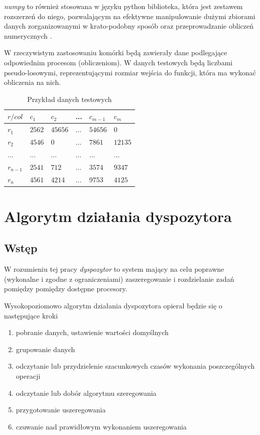 \documentclass[brudnopis]{xmgr}
\begin{document}
\emph{numpy} to również stosowana w języku python biblioteka, która jest zestawem rozszerzeń do niego, pozwalającym na efektywne manipulowanie dużymi zbiorami danych zorganizowanymi w krato-podobny sposób oraz przeprowadzanie obliczeń numerycznych \cite{NUMPY1:2020:X} \cite{NUMPY2:1999:X}.
\medskip

W rzeczywistym zastosowaniu komórki będą zawierały dane podlegające odpowiednim procesom (obliczeniom).
W danych testowych będą liczbami pseudo-losowymi, reprezentującymi rozmiar wejścia do funkcji, która ma wykonać obliczenia na nich.
\medskip

\begin{table}[!tbh]
\begin{tabular}{|l|l|l|l|l|l|} \hline
$r / col$   & $c_1$     & $c_2$     & ...   & $c_{m-1}$ & $c_{m}$   \\ \hline
$r_1$       & $2562$    & $45656$   & ...   & $54656$   & $0$       \\ \hline
$r_2$       & $4546$    & $0$       & ...   & $7861$    & $12135$   \\ \hline
$...$       & $...$     & $...$     & $...$ & $...$     & $...$     \\ \hline
$r_{n-1}$   & $2541$   & $712$      & ...   & $3574$    & $9347$    \\ \hline
$r_{n}$     & $4561$   & $4214$     & ...   & $9753$    & $4125$    \\ \hline
\end{tabular}
\caption{Przykład danych testowych\label{tab:example-test_data}}
\end{table}

\chapter{Algorytm działania dyspozytora}

\section{Wstęp}

W rozumieniu tej pracy \emph{dyspozytor} to system mający na celu poprawne (wykonalne i zgodne z ograniczeniami) zaszeregowanie i rozdzielanie zadań pomiędzy pomiędzy dostępne procesory.
\medskip

Wysokopoziomowo algorytm działania dyspozytora opierał będzie się o następujące kroki

\begin{enumerate}
    \item pobranie danych, ustawienie wartości domyślnych
    \item grupowanie danych
    \item odczytanie lub przydzielenie szacunkowych czasów wykonania poszczególnych operacji
    \item odczytanie lub dobór algorytmu szeregowania 
    \item przygotowanie uszeregowania
    \item czuwanie nad prawidłowym wykonaniem uszeregowania
\end{enumerate}
\end{document}

